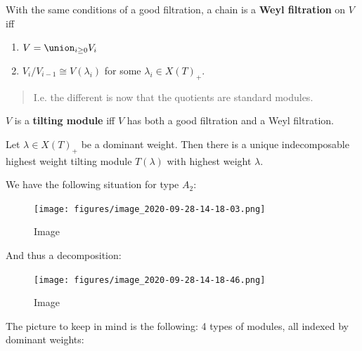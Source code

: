 \begin{definition}

With the same conditions of a good filtration, a chain is a \textbf{Weyl
filtration} on \(V\) iff

\begin{enumerate}
\def\labelenumi{\arabic{enumi}.}
\item
  \(V = \union_{i\geq 0} V_i\)
\item
  \(V_i/V_{i-1} \cong V(\lambda_i)\) for some \(\lambda_i \in X(T)_+\).
\end{enumerate}

\begin{quote}
I.e. the different is now that the quotients are standard modules.
\end{quote}

\end{definition}

\begin{definition}

\(V\) is a \textbf{tilting module} iff \(V\) has both a good filtration
and a Weyl filtration.

\end{definition}

\begin{theorem}[Ringel, 1990s]

Let \(\lambda \in X(T)_+\) be a dominant weight. Then there is a unique
indecomposable highest weight tilting module \(T(\lambda)\) with highest
weight \(\lambda\).

\end{theorem}

\begin{example}

We have the following situation for type \(A_2\):

\begin{figure}
\centering
\texttt{[image: figures/image\_2020-09-28-14-18-03.png]}
\caption{Image}
\end{figure}

And thus a decomposition:

\begin{figure}
\centering
\texttt{[image: figures/image\_2020-09-28-14-18-46.png]}
\caption{Image}
\end{figure}

\end{example}

The picture to keep in mind is the following: 4 types of modules, all
indexed by dominant weights:

